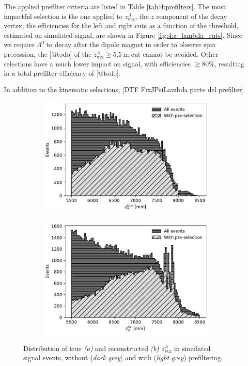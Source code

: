 The applied prefilter criteria are listed in Table \ref{tab:4:prefilters}.
The most impactful selection is the one applied to $z_\text{vtx}^\Lambda$, the $z$ component of the \lambdadecay decay vertex;
the efficiencies for the left and right cuts as a function of the threshold, estimated on simulated signal, are shown in Figure \ref{fig:4:z_lambda_cuts}.
Since we require $\Lambda^0$ to decay after the dipole magnet in order to observe spin precession, the [@todo] of the $z_\text{vtx}^\Lambda \geq \SI{5.5}{\meter}$ cut cannot be avoided.
Other selections have a much lower impact on signal, with efficiencies $\gtrsim 80\%$, resulting in a total prefilter efficiency of [@todo].

In addition to the kinematic selections, [DTF FixJPsiLambda parte del prefilter]

\begin{figure}[t]
	\centering
	\begin{subfigure}{.45\textwidth}
		\includegraphics[width=\textwidth]{graphics/04-event_selection/Lambda_endvertex_z_true.pdf}
		\caption{}
	\end{subfigure}
	\begin{subfigure}{.45\textwidth}
		\includegraphics[width=\textwidth]{graphics/04-event_selection/Lambda_endvertex_z.pdf}
		\caption{}
	\end{subfigure}
	\caption{Distribution of true \textit{(a)} and reconstructed \textit{(b)} $z_\text{vtx}^\Lambda$ in simulated \demonstratorshort signal events, without (\textit{dark grey}) and with (\textit{light grey}) prefiltering.}
\end{figure}

